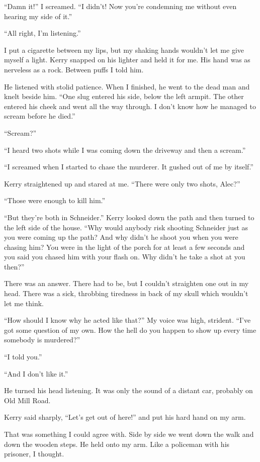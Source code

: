 \documentclass{novel}
\begin{document}
“Damn it!” I screamed. “I didn’t! Now you’re condemning me without even hearing my side of it.”

“All right, I’m listening.”

I put a cigarette between my lips, but my shaking hands wouldn’t let me give myself a light. Kerry snapped on his lighter and held it for me. His hand was as nerveless as a rock. Between puffs I told him.

He listened with stolid patience. When I finished, he went to the dead man and knelt beside him. “One slug entered his side, below the left armpit. The other entered his cheek and went all the way through. I don’t know how he managed to scream before he died.”

“Scream?”

“I heard two shots while I was coming down the driveway and then a scream.”

“I screamed when I started to chase the murderer. It gushed out of me by itself.”

Kerry straightened up and stared at me. “There were only two shots, Alec?”

“Those were enough to kill him.”

“But they’re both in Schneider.” Kerry looked down the path and then turned to the left side of the house. “Why would anybody risk shooting Schneider just as you were coming up the path? And why didn’t he shoot you when you were chasing him? You were in the light of the porch for at least a few seconds and you said you chased him with your flash on. Why didn’t he take a shot at you then?”

There was an answer. There had to be, but I couldn’t straighten one out in my head. There was a sick, throbbing tiredness in back of my skull which wouldn’t let me think.

“How should I know why he acted like that?” My voice was high, strident. “I’ve got some question of my own. How the hell do you happen to show up every time somebody is murdered?”

“I told you.”

“And I don’t like it.”

He turned his head listening. It was only the sound of a distant car, probably on Old Mill Road.

Kerry said sharply, “Let’s get out of here!” and put his hard hand on my arm.

That was something I could agree with. Side by side we went down the walk and down the wooden steps. He held onto my arm. Like a policeman with his prisoner, I thought.
\end{document}
